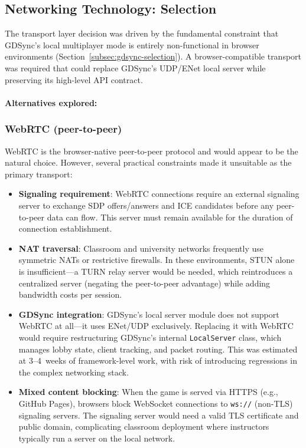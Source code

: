 \subsection{Networking Technology: Selection}
\label{subsec:http-sse-selection}

The transport layer decision was driven by the fundamental constraint that GDSync's local multiplayer mode is entirely non-functional in browser environments (Section~\ref{subsec:gdsync-selection}). A browser-compatible transport was required that could replace GDSync's UDP/ENet local server while preserving its high-level API contract.

\paragraph*{Alternatives explored:}

\subsubsection*{WebRTC (peer-to-peer)}

WebRTC is the browser-native peer-to-peer protocol and would appear to be the natural choice. However, several practical constraints made it unsuitable as the primary transport:

\begin{itemize}
    \item \textbf{Signaling requirement}: WebRTC connections require an external signaling server to exchange SDP offers/answers and ICE candidates before any peer-to-peer data can flow. This server must remain available for the duration of connection establishment.
    \item \textbf{NAT traversal}: Classroom and university networks frequently use symmetric NATs or restrictive firewalls. In these environments, STUN alone is insufficient---a TURN relay server would be needed, which reintroduces a centralized server (negating the peer-to-peer advantage) while adding bandwidth costs per session.
    \item \textbf{GDSync integration}: GDSync's local server module does not support WebRTC at all---it uses ENet/UDP exclusively. Replacing it with WebRTC would require restructuring GDSync's internal \texttt{LocalServer} class, which manages lobby state, client tracking, and packet routing. This was estimated at 3--4~weeks of framework-level work, with risk of introducing regressions in the complex networking stack.
    \item \textbf{Mixed content blocking}: When the game is served via HTTPS (e.g., GitHub Pages), browsers block WebSocket connections to \texttt{ws://} (non-TLS) signaling servers. The signaling server would need a valid TLS certificate and public domain, complicating classroom deployment where instructors typically run a server on the local network.
\end{itemize}

